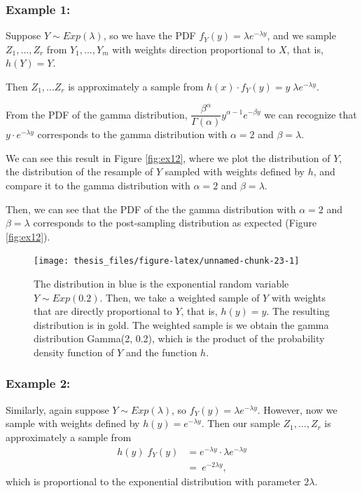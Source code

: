 \documentclass[12pt,twoside]{smiththesis}
\begin{document}
\newpage

\hypertarget{example-1}{%
\subsubsection{Example 1:}\label{example-1}}

Suppose \(Y \sim Exp(\lambda)\), so we have the PDF \(f_Y(y) = \lambda e^{-\lambda y}\), and we sample \(Z_1,\dots,Z_r\) from \(Y_1, \dots, Y_m\) with weights direction proportional to \(X\), that is, \(h(Y) = Y\).

Then \(Z_1,\dots Z_r\) is approximately a sample from \(h(x) \cdot f_Y(y) = y \; \lambda e^{-\lambda y}\).

From the PDF of the gamma distribution, \(\dfrac{\beta^\alpha}{\Gamma(\alpha) }y^{\alpha - 1} e^{-\beta y}\) we can recognize that \(y \cdot e^{-\lambda y}\) corresponds to the gamma distribution with \(\alpha = 2\) and \(\beta = \lambda\).

We can see this result in Figure \ref{fig:ex12}, where we plot the distribution of \(Y\), the distribution of the resample of \(Y\) sampled with weights defined by \(h\), and compare it to the gamma distribution with \(\alpha = 2\) and \(\beta = \lambda\).

Then, we can see that the PDF of the the gamma distribution with \(\alpha = 2\) and \(\beta = \lambda\) corresponds to the post-sampling distribution as expected (Figure \ref{fig:ex12}).
\begin{figure}

{\centering \texttt{[image: thesis\_files/figure-latex/unnamed-chunk-23-1]} 

}

\caption{\label{fig:ex12} The distribution in blue is the exponential random variable $Y \sim Exp(0.2)$. Then, we take a weighted sample of $Y$ with weights that are directly proportional to $Y$, that is, $h(y)=y$. The resulting distribution is in gold. The weighted sample is we obtain the gamma distribution Gamma(2, 0.2), which is the product of the probability density function of $Y$ and the function $h$.}\label{fig:unnamed-chunk-23}
\end{figure}
\newpage

\hypertarget{example-2}{%
\subsubsection{Example 2:}\label{example-2}}

Similarly, again suppose \(Y \sim Exp(\lambda)\), so \(f_Y(y) = \lambda e^{-\lambda y}\). However, now we sample with weights defined by \(h(y)= e^{-\lambda y}\).
Then our sample \(Z_1,\dots,Z_r\) is approximately a sample from
\begin{align*} 
h(y) \; f_Y(y) &=   e^{-\lambda y} \cdot \lambda e^{-\lambda y}\\
&= \ e^{-2 \lambda y},  
\end{align*}
which is proportional to the exponential distribution with parameter \(2\lambda\).
\end{document}

